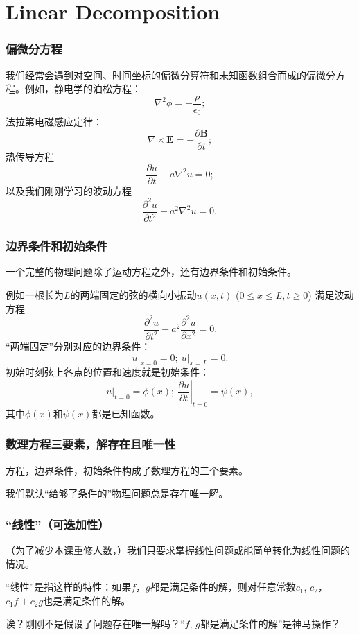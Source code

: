\documentclass[CJK]{beamer}
\begin{document}
\section{Linear Decomposition}


\begin{frame}
  \frametitle{偏微分方程}
  我们经常会遇到对空间、时间坐标的偏微分算符和未知函数组合而成的偏微分方程。例如，静电学的泊松方程：
  $$ \nabla^2\phi = -\frac{\rho}{\epsilon_0};$$
  法拉第电磁感应定律：
  $$ \nabla\times \mathbf{E} = -\frac{\partial \mathbf{B}}{\partial t};$$
  热传导方程
  $$\frac{\partial u}{\partial t} - a\nabla^2 u = 0;$$
  以及我们刚刚学习的波动方程
  $$\frac{\partial ^2u}{\partial t^2}  -  a^2 \nabla^2 u = 0, $$
\end{frame}




\begin{frame}
  \frametitle{边界条件和初始条件}
  一个完整的物理问题除了运动方程之外，还有边界条件和初始条件。

  例如一根长为$L$的两端固定的弦的横向小振动$u(x, t)$ ($0\le x\le L, t\ge 0$) 满足波动方程
  $$\frac{\partial^2u}{\partial t^2} - a^2\frac{\partial^2u}{\partial x^2} = 0 .$$
  “两端固定”分别对应的边界条件：
  $$ \left.u\right\vert_{x=0} = 0;\ \left.u\right\vert_{x=L} = 0.$$
  初始时刻弦上各点的位置和速度就是初始条件：
  $$ \left.u\right\vert_{t=0} = \phi(x);\ \left.\frac{\partial u}{\partial t}\right\vert_{t=0} = \psi(x),$$
  其中$\phi(x)$和$\psi(x)$都是已知函数。
\end{frame}

\begin{frame}
  \frametitle{数理方程三要素，解存在且唯一性}
  
  {\blue 方程，边界条件，初始条件构成了数理方程的三个要素。}

  \skipline

  我们默认“给够了条件的”物理问题总是存在唯一解。
\end{frame}


\begin{frame}
  \frametitle{“线性”（可迭加性）}
  （为了减少本课重修人数，）{\blue 我们只要求掌握线性问题或能简单转化为线性问题的情况。}

  “线性”是指这样的特性：如果$f$，$g$都是满足条件的解，则对任意常数$c_1$, $c_2$，$c_1f+c_2g$也是满足条件的解。


  诶？刚刚不是假设了问题存在唯一解吗？“$f$, $g$都是满足条件的解”是神马操作？
  
\end{frame}
\end{document}
